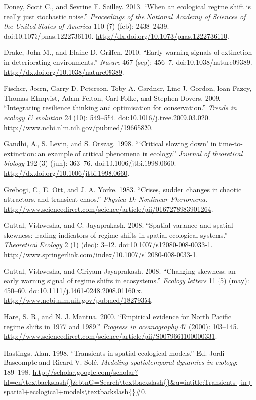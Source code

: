 \documentclass[author-year, review]{elsarticle} %
\begin{document}
Doney, Scott C., and Sevrine F. Sailley. 2013. ``When an ecological
regime shift is really just stochastic noise.'' \emph{Proceedings of the
National Academy of Sciences of the United States of America} 110 (7)
(feb): 2438--2439. doi:10.1073/pnas.1222736110.
\url{http://dx.doi.org/10.1073/pnas.1222736110}.

Drake, John M., and Blaine D. Griffen. 2010. ``Early warning signals of
extinction in deteriorating environments.'' \emph{Nature} 467 (sep):
456--7. doi:10.1038/nature09389.
\url{http://dx.doi.org/10.1038/nature09389}.

Fischer, Joern, Garry D. Peterson, Toby A. Gardner, Line J. Gordon, Ioan
Fazey, Thomas Elmqvist, Adam Felton, Carl Folke, and Stephen Dovers.
2009. ``Integrating resilience thinking and optimisation for
conservation.'' \emph{Trends in ecology \& evolution} 24 (10): 549--554.
doi:10.1016/j.tree.2009.03.020.
\url{http://www.ncbi.nlm.nih.gov/pubmed/19665820}.

Gandhi, A., S. Levin, and S. Orszag. 1998. ```Critical slowing down' in
time-to-extinction: an example of critical phenomena in ecology.''
\emph{Journal of theoretical biology} 192 (3) (jun): 363--76.
doi:10.1006/jtbi.1998.0660.
\url{http://dx.doi.org/10.1006/jtbi.1998.0660}.

Grebogi, C., E. Ott, and J. A. Yorke. 1983. ``Crises, sudden changes in
chaotic attractors, and transient chaos.'' \emph{Physica D: Nonlinear
Phenomena}.
\url{http://www.sciencedirect.com/science/article/pii/0167278983901264}.

Guttal, Vishwesha, and C. Jayaprakash. 2008. ``Spatial variance and
spatial skewness: leading indicators of regime shifts in spatial
ecological systems.'' \emph{Theoretical Ecology} 2 (1) (dec): 3--12.
doi:10.1007/s12080-008-0033-1.
\url{http://www.springerlink.com/index/10.1007/s12080-008-0033-1}.

Guttal, Vishwesha, and Ciriyam Jayaprakash. 2008. ``Changing skewness:
an early warning signal of regime shifts in ecosystems.'' \emph{Ecology
letters} 11 (5) (may): 450--60. doi:10.1111/j.1461-0248.2008.01160.x.
\url{http://www.ncbi.nlm.nih.gov/pubmed/18279354}.

Hare, S. R., and N. J. Mantua. 2000. ``Empirical evidence for North
Pacific regime shifts in 1977 and 1989.'' \emph{Progress in
oceanography} 47 (2000): 103--145.
\url{http://www.sciencedirect.com/science/article/pii/S0079661100000331}.

Hastings, Alan. 1998. ``Transients in spatial ecological models.'' Ed.
Jordi Bascompte and Ricard V. Solé. \emph{Modeling spatiotemporal
dynamics in ecology}: 189--198.
\url{http://scholar.google.com/scholar?hl=en\textbackslash{}\&btnG=Search\textbackslash{}\&q=intitle:Transients+in+spatial+ecological+models\textbackslash{}\#0}.
\end{document}
